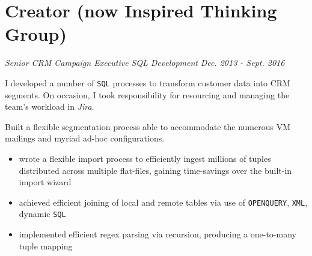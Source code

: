 \documentclass[../cv.tex]{subfiles}
\begin{document}
\section{Creator (now Inspired Thinking Group)}
\textit{Senior CRM Campaign Executive}
\hfill
\textit{SQL Development}
\hfill
\textit{Dec. 2013 - Sept. 2016}
\begin{paragraph}
	I developed a number of \texttt{SQL} processes to transform customer data into CRM segments. On occasion, I took responsibility for resourcing and managing the team's workload in \textit{Jira}.
\end{paragraph}
\begin{description}[style=multiline,leftmargin=3cm]
	\item[Virgin Media Segmentation \tiny\textnormal{\href{https://adrian.ng/SQL/recursion}{adrian.ng/SQL/recursion}} \textnormal{\href{https://adrian.ng/openquery-xml}{adrian.ng/openquery-xml}}]
	      Built a flexible segmentation process able to accommodate the numerous VM mailings and myriad ad-hoc configurations.
	      \begin{itemize}
		      \item wrote a flexible import process to efficiently ingest millions of tuples distributed across multiple flat-files, gaining time-savings over the built-in import wizard
		      \item achieved efficient joining of local and remote tables via use of \texttt{OPENQUERY}, \texttt{XML}, dynamic \texttt{SQL}
		      \item implemented efficient regex parsing via recursion, producing a one-to-many tuple mapping
	      \end{itemize}
\end{description}
\end{document}
